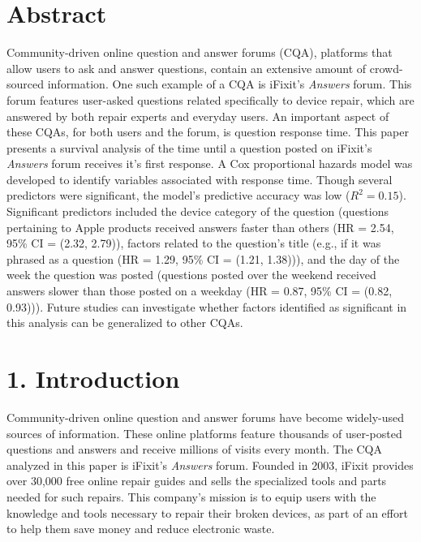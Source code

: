 \documentclass{article}
\begin{document}


\makeatletter
\DeclareRobustCommand\bfseries{%
  \not@math@alphabet\bfseries\mathbf
  \fontseries\bfdefault\selectfont
  \boldmath %
}
\makeatother





\section*{Abstract}  

Community-driven online question and answer forums (CQA), platforms that allow users to ask and answer questions, contain an extensive amount of crowd-sourced information. One such example of a CQA is iFixit's \textit{Answers} forum. This forum features user-asked questions related specifically to device repair, which are answered by both repair experts and everyday users. An important aspect of these CQAs, for both users and the forum, is question response time. This paper presents a survival analysis of the time until a question posted on iFixit's \textit{Answers} forum receives it's first response. A Cox proportional hazards model was developed to identify variables associated with response time. Though several predictors were significant, the model's predictive accuracy was low ($R^2 = 0.15$). Significant predictors included the device category of the question (questions pertaining to Apple products received answers faster than others (HR = 2.54, 95\% CI = (2.32, 2.79)), factors related to the question's title (e.g., if it was phrased as a question (HR = 1.29, 95\% CI = (1.21, 1.38))), and the day of the week the question was posted (questions posted over the weekend received answers slower than those posted on a weekday (HR = 0.87, 95\% CI = (0.82, 0.93))). Future studies can investigate whether factors identified as significant in this analysis can be generalized to other CQAs.


\section*{1. Introduction}

Community-driven online question and answer forums have become widely-used sources of information. These online platforms feature thousands of user-posted questions and answers and receive millions of visits every month. The CQA analyzed in this paper is iFixit's \textit{Answers} forum. Founded in 2003, iFixit provides over 30,000 free online repair guides and sells the specialized tools and parts needed for such repairs. This company's mission is to equip users with the knowledge and tools necessary to repair their broken devices, as part of an effort to help them save money and reduce electronic waste. 
    
\end{document}
